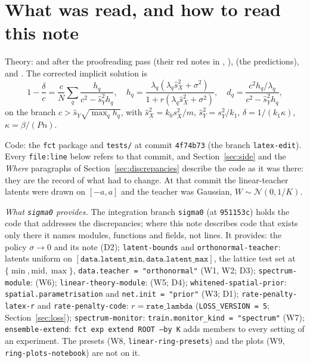 \documentclass[11pt,a4paper]{article}
\newcommand{\sX}{\hat s_X^2}
\newcommand{\sY}{\hat s_Y^2}
\newcommand{\code}[1]{\texttt{#1}}
\begin{document}
\tableofcontents

\section{What was read, and how to read this note}
\label{sec:scope}
Theory:  and  after the proofreading pass (their red notes in , ),  (the predictions),  and . The corrected implicit solution is
\begin{equation}
  1 - \frac\delta c = \frac cN\sum_q\frac{h_q}{c^2 - \sY h_q},\quad
  h_q = \frac{\lambda_q(\lambda_q\sX + \sigma^2)}{1 + r(\lambda_q\sX + \sigma^2)},\quad
  d_q = \frac{c^2h_q/\lambda_q}{c^2 - \sY h_q},
  \label{eq:linear-soln}
\end{equation}
on the branch $c > \hat s_Y\sqrt{\max_q h_q}$, with $\sX = k_0 s_X^2/m$, $\sY = s_Y^2/k_1$, $\delta = 1/(k_1\kappa)$, $\kappa = \beta/(Pn)$.

Code: the \code{fct} package and \code{tests/} at commit \code{4f74b73} (the branch \code{latex-edit}). Every \code{file:line} below refers to that commit, and Section~\ref{sec:side} and the \emph{Where} paragraphs of Section~\ref{sec:discrepancies} describe the code as it was there: they are the record of what had to change. At that commit the linear-teacher latents were drawn on $[-a, a]$ and the teacher was Gaussian, $W\sim\mathcal N(0, 1/K)$.

\emph{What \code{sigma0} provides.} The integration branch \code{sigma0} (at \code{951153c}) holds the code that addresses the discrepancies; where this note describes code that exists only there it names modules, functions and fields, not lines. It provides: the policy $\sigma\to0$ and its note  (D2); \code{latent-bounds} and \code{orthonormal-teacher}: latents uniform on $[\code{data.latent\_min}, \code{data.latent\_max}]$, the lattice test set at $\{\min, \mathrm{mid}, \max\}$, \code{data.teacher = "orthonormal"} (W1, W2; D3); \code{spectrum-module}:  (W6); \code{linear-theory-module}:  (W5; D4); \code{whitened-spatial-prior}: \code{spatial.parametrisation} and \code{net.init = "prior"} (W3; D1); \code{rate-penalty-latex-r} and \code{rate-penalty-code}: $r = \code{rate\_lambda}$ (\code{LOSS\_VERSION = 5}; Section~\ref{sec:loss}); \code{spectrum-monitor}: \code{train.monitor\_kind = "spectrum"} (W7); \code{ensemble-extend}: \code{fct exp extend ROOT --by K} adds members to every setting of an experiment. The presets (W8, \code{linear-ring-presets}) and the plots (W9, \code{ring-plots-notebook}) are not on it.
\end{document}

